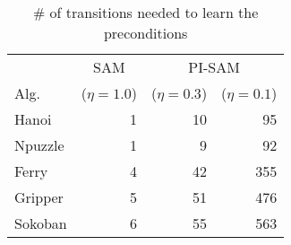 \documentclass[letterpaper]{article} %
\begin{document}
\begin{table}[b]
\centering
{}
\caption{Results on Blocks with $\eta = 0.3$.}
\label{tab:results1}
\end{table}

\begin{table}
\centering
\begin{tabular}{@{}l|r|rr@{}}
\toprule
    & \multicolumn{1}{c}{SAM} & \multicolumn{2}{c}{PI-SAM} \\
Alg.     & ($\eta=1.0$) & ($\eta=0.3$)    & ($\eta=0.1$)    \\ \midrule
Hanoi   & 1   & 10     & 95     \\
Npuzzle & 1   & 9      & 92     \\
Ferry   & 4   & 42     & 355    \\
Gripper & 5   & 51     & 476    \\
Sokoban & 6   & 55     & 563    \\ \bottomrule
\end{tabular}
\caption{\# of transitions needed to learn the preconditions}
\label{tab:results2}
\end{table}
\end{document}
